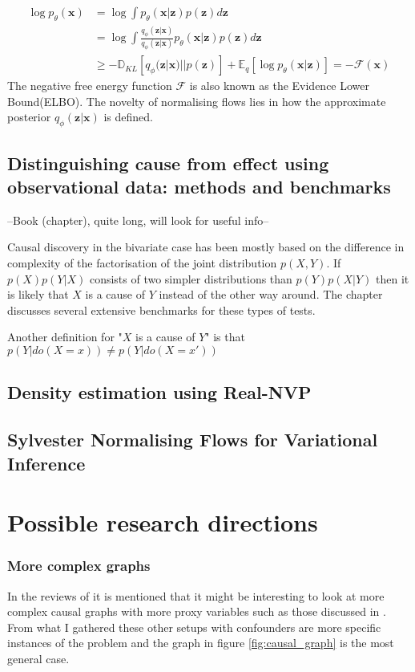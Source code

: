 \documentclass{article}
\newcommand{\bx}{\mathbf{x}}
\newcommand{\bz}{\mathbf{z}}
\begin{document}
\begin{equation}\label{equation:neg_free_energy}
    \begin{split}
    \log p_\theta(\bx) &= \log \int p_\theta(\bx | \bz) p(\bz) d\bz\\
    &= \log \int \frac{q_\phi(\bz|\bx)}{q_\phi(\bz|\bx)} p_\theta(\bx | \bz) p(\bz) d\bz\\
    &\geq -\mathbb{D}_{KL}[q_\phi(\bz|\bx) || p(\bz)] + \mathbb{E}_q[\log p_\theta(\bx|\bz)] = -\mathcal{F}(\bx)
    \end{split}    
\end{equation}
The negative free energy function $\mathcal{F}$ is also known as the Evidence Lower Bound(ELBO). The novelty of normalising flows lies in how the approximate posterior $q_\phi(\bz|\bx)$ is defined.  

\subsection*{Distinguishing cause from effect using observational data: methods and benchmarks}
--Book (chapter)\cite{mooij2016distinguishing}, quite long, will look for useful info--

Causal discovery in the bivariate case has been mostly based on the difference in complexity of the factorisation of the joint distribution $p(X,Y)$. If $p(X)p(Y|X)$ consists of two simpler distributions than $p(Y)p(X|Y)$ then it is likely that $X$ is a cause of $Y$ instead of the other way around. The chapter discusses several extensive benchmarks for these types of tests.

Another definition for "$X$ is a cause of $Y$" is that $p(Y|do(X=x)) \neq p(Y|do(X=x'))$

\subsection*{Density estimation using Real-NVP}

\subsection*{Sylvester Normalising Flows for Variational Inference}


\section{Possible research directions}
\subsubsection*{More complex graphs}
In the reviews of \cite{louizos2017causal} it is mentioned that it might be interesting to look at more complex causal graphs with more proxy variables such as those discussed in \cite{miao2018identifying}. From what I gathered these other setups with confounders are more specific instances of the problem and the graph in figure \ref{fig:causal_graph} is the most general case. 
\end{document}

